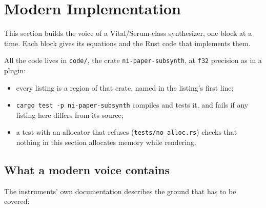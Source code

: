 \documentclass[conference]{IEEEtran}
\begin{document}
\setcounter{section}{2}
\section{Modern Implementation}
This section builds the voice of a Vital/Serum-class synthesizer, one block at a time. Each block gives its equations and the Rust code that implements them.

All the code lives in \texttt{code/\allowbreak{}}, the crate \texttt{ni-paper-subsynth}, at \texttt{f32} precision as in a plugin:

\begin{itemize}
\item every listing is a region of that crate, named in the listing's first line;
\item \texttt{cargo test -p ni-paper-subsynth} compiles and tests it, and fails if any listing here differs from its source;
\item a test with an allocator that refuses (\texttt{tests/\allowbreak{}no\_\allowbreak{}alloc.\allowbreak{}rs}) checks that nothing in this section allocates memory while rendering.
\end{itemize}

\setcounter{subsection}{-1}
\subsection{What a modern voice contains}
The instruments' own documentation describes the ground that has to be covered:
\end{document}
